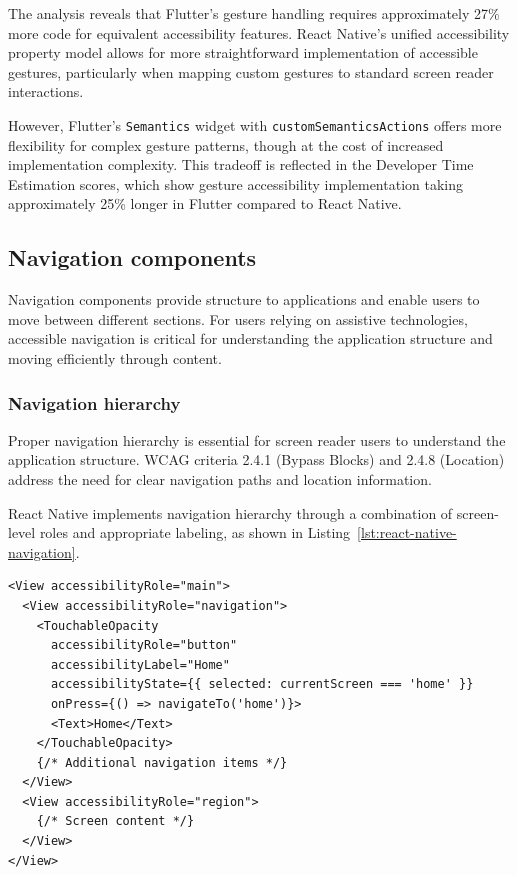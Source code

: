 The analysis reveals that Flutter's gesture handling requires approximately 27\% more code for equivalent accessibility features. React Native's unified accessibility property model allows for more straightforward implementation of accessible gestures, particularly when mapping custom gestures to standard screen reader interactions.

However, Flutter's \texttt{Semantics} widget with \texttt{customSemanticsActions} offers more flexibility for complex gesture patterns, though at the cost of increased implementation complexity. This tradeoff is reflected in the Developer Time Estimation scores, which show gesture accessibility implementation taking approximately 25\% longer in Flutter compared to React Native.

\subsection{Navigation components}
\label{subsec:navigation-components}

Navigation components provide structure to applications and enable users to move between different sections. For users relying on assistive technologies, accessible navigation is critical for understanding the application structure and moving efficiently through content.

\subsubsection{Navigation hierarchy}
\label{subsubsec:navigation-hierarchy}

Proper navigation hierarchy is essential for screen reader users to understand the application structure. WCAG criteria 2.4.1 (Bypass Blocks) and 2.4.8 (Location) address the need for clear navigation paths and location information.

React Native implements navigation hierarchy through a combination of screen-level roles and appropriate labeling, as shown in Listing~\ref{lst:react-native-navigation}.

\begin{lstlisting}[style=ReactNativeStyle, caption=Navigation hierarchy in React Native, label=lst:react-native-navigation]
<View accessibilityRole="main">
  <View accessibilityRole="navigation">
    <TouchableOpacity
      accessibilityRole="button"
      accessibilityLabel="Home"
      accessibilityState={{ selected: currentScreen === 'home' }}
      onPress={() => navigateTo('home')}>
      <Text>Home</Text>
    </TouchableOpacity>
    {/* Additional navigation items */}
  </View>
  <View accessibilityRole="region">
    {/* Screen content */}
  </View>
</View>
\end{lstlisting}

